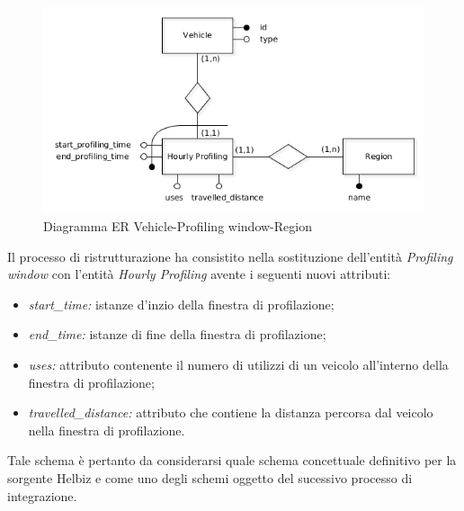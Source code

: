\begin{figure}[H]                                                                                                                                                            
\centering                                                                                                                                                                   
\includegraphics[width=\textwidth]{diagrams/vehicle_hour_profiling_er}                                                                                                                                   
\caption{Diagramma ER Vehicle-Profiling window-Region}                                                                                                                                            
\label{fig:vehicle_hour_profiling_er}                                                                                                                                                           
\end{figure}

Il processo di ristrutturazione ha consistito nella sostituzione dell'entità
\textit{Profiling window} con l'entità \textit{Hourly Profiling} avente i
seguenti nuovi attributi:
\begin{itemize}
\item \textit{start\_time:} istanze d'inzio della finestra di profilazione;
\item \textit{end\_time:} istanze di fine della finestra di profilazione;
\item \textit{uses:} attributo contenente il numero di utilizzi di un
veicolo all'interno della finestra di profilazione;
\item \textit{travelled\_distance:} attributo che contiene la distanza 
percorsa dal veicolo nella finestra di profilazione.
\end{itemize}
Tale schema è pertanto da considerarsi quale schema concettuale definitivo per la
sorgente Helbiz e come uno degli schemi oggetto del sucessivo processo di
integrazione.

